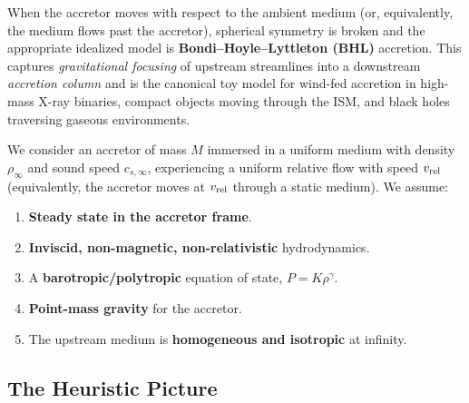 When the accretor moves with respect to the ambient medium (or, equivalently, the medium flows past the accretor), spherical symmetry is broken and the appropriate idealized model is \textbf{Bondi--Hoyle--Lyttleton (BHL)} accretion. This captures \emph{gravitational focusing} of upstream streamlines into a downstream \emph{accretion column} and is the canonical toy model for wind-fed accretion in high-mass X-ray binaries, compact objects moving through the ISM, and black holes traversing gaseous environments.
\par
We consider an accretor of mass $M$ immersed in a uniform medium with density $\rho_\infty$ and sound speed $c_{s,\infty}$, experiencing a uniform relative flow with speed $v_{\rm rel}$ (equivalently, the accretor moves at $v_{\rm rel}$
through a static medium). We assume:
\vspace{10pt}
\begin{enumerate}
    \item \textbf{Steady state in the accretor frame}.
    \item \textbf{Inviscid, non-magnetic, non-relativistic} hydrodynamics.
    \item A \textbf{barotropic/polytropic} equation of state, $P=K\rho^\gamma$.
    \item \textbf{Point-mass gravity} for the accretor.
    \item The upstream medium is \textbf{homogeneous and isotropic} at infinity.
\end{enumerate}
\vspace{10pt}

\subsection{The Heuristic Picture}

